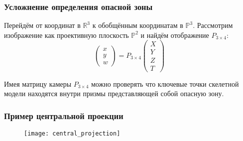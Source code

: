 \begin{frame}
    \frametitle{Усложнение определения опасной зоны}
    Перейдём от координат в $\mathbb{R}^3$ к обобщённым координатам в $\mathbb{P}^3$. Рассмотрим изображение как проективную плоскость $\mathbb{P}^2$ и найдём отображение $P_{3\times4}$:
    \begin{equation*}
        \left(
        \begin{array}{c}
            x \\
            y \\
            w
        \end{array}
        \right) =
        P_{3\times4}
        \left(
        \begin{array}{c}
            X \\
            Y \\
            Z \\
            T
        \end{array}
        \right)
    \end{equation*}

    Имея матрицу камеры $P_{3\times4}$ можно проверять что ключевые точки скелетной модели находятся внутри призмы представляющей собой опасную зону.
\end{frame}

\begin{frame}
    \frametitle{Пример центральной проекции}
    \begin{figure}
        \centering
        \texttt{[image: central\_projection]}
    \end{figure}
\end{frame}